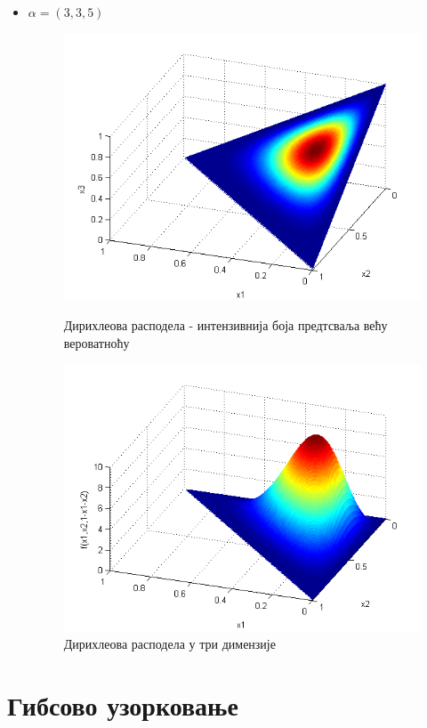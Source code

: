 \begin{itemize}
\item $\alpha = (3,3,5)$
\begin{figure}[H]
  \includegraphics[scale=0.4]{./Slike/slika35.png} 
  \caption{Дирихлеова расподела - интензивнија боја предтсваља већу вероватноћу}\label{fig:slika25}
\endminipage\hfill
{}
  \includegraphics[scale=0.4]{./Slike/slika36.png} 
  \caption{Дирихлеова расподела у три димензије}\label{fig:slika26}
\endminipage\hfill

\end{figure}
\end{itemize}

\section{Гибсово узорковање}
